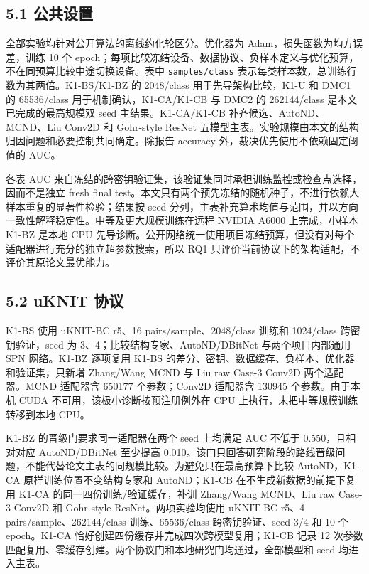 \documentclass[
  a4paper,
  UTF8]{ctexart}
\begin{document}
\hypertarget{ux516cux5171ux8bbeux7f6e}{%
\subsection{5.1 公共设置}\label{ux516cux5171ux8bbeux7f6e}}

全部实验均针对公开算法的离线约化轮区分。优化器为
Adam，损失函数为均方误差，训练 10 个
epoch；每项比较冻结设备、数据协议、负样本定义与优化预算，不在同预算比较中途切换设备。表中
\texttt{samples/class} 表示每类样本数，总训练行数为其两倍。K1-BS/K1-BZ
的 2048/class 用于先导架构比较，K1-U 和 DMC1 的 65536/class
用于机制确认，K1-CA/K1-CB 与 DMC2 的 262144/class
是本文已完成的最高规模双 seed 主结果。K1-CA/K1-CB
补齐候选、AutoND、MCND、Liu Conv2D 和 Gohr-style ResNet
五模型主表。实验规模由本文的结构归因问题和必要控制共同确定。除报告
accuracy 外，裁决优先使用不依赖固定阈值的 AUC。

各表 AUC
来自冻结的跨密钥验证集，该验证集同时承担训练监控或检查点选择，因而不是独立
fresh final
test。本文只有两个预先冻结的随机种子，不进行依赖大样本重复的显著性检验；结果按
seed
分列，主表补充算术均值与范围，并以方向一致性解释稳定性。中等及更大规模训练在远程
NVIDIA A6000 上完成，小样本 K1-BZ 是本地 CPU
先导诊断。公开网络统一使用项目冻结预算，但没有对每个适配器进行充分的独立超参数搜索，所以
RQ1 只评价当前协议下的架构适配，不评价其原论文最优能力。

\hypertarget{uknit-ux534fux8bae}{%
\subsection{5.2 uKNIT 协议}\label{uknit-ux534fux8bae}}

K1-BS 使用 uKNIT-BC r5、16 pairs/sample、2048/class 训练和 1024/class
跨密钥验证，seed 为 3、4；比较结构专家、AutoND/DBitNet
与两个项目内部通用 SPN 网络。K1-BZ 逐项复用 K1-BS
的差分、密钥、数据缓存、负样本、优化器和验证集，只新增 Zhang/Wang MCND
与 Liu raw Case-3 Conv2D 两个适配器。MCND 适配器含 650177 个参数；Conv2D
适配器含 130945 个参数。由于本机 CUDA 不可用，该极小诊断按预注册例外在
CPU 上执行，未把中等规模训练转移到本地 CPU。

K1-BZ 的晋级门要求同一适配器在两个 seed 上均满足 AUC 不低于
0.550，且相对对应 AutoND/DBitNet 至少提高
0.010。该门只回答研究阶段的路线晋级问题，不能代替论文主表的同规模比较。为避免只在最高预算下比较
AutoND，K1-CA 原样训练位置不变结构专家和 AutoND；K1-CB
在不生成新数据的前提下复用 K1-CA 的同一四份训练/验证缓存，补训
Zhang/Wang MCND、Liu raw Case-3 Conv2D 和 Gohr-style
ResNet。两项实验均使用 uKNIT-BC r5、4 pairs/sample、262144/class
训练、65536/class 跨密钥验证、seed 3/4 和 10 个 epoch。K1-CA
恰好创建四份缓存并完成四次跨模型复用；K1-CB 记录 12
次参数匹配复用、零缓存创建。两个协议门和本地研究门均通过，全部模型和 seed
均进入主表。
\end{document}
